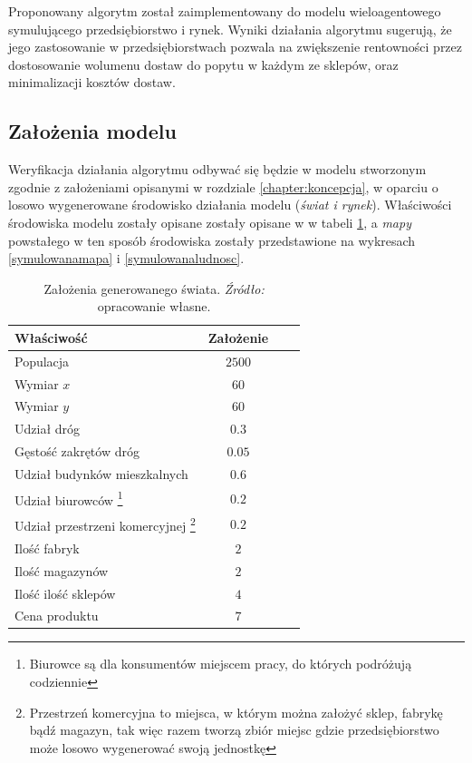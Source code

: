 \documentclass[polish, twoside, 12pt, a4paper]{article}
\theoremstyle{definition}
\theoremstyle{plain}
\theoremstyle{remark}
\begin{document}
Proponowany algorytm został zaimplementowany do modelu wieloagentowego symulującego przedsiębiorstwo i rynek. Wyniki działania algorytmu sugerują, że jego zastosowanie w przedsiębiorstwach pozwala na zwiększenie rentowności przez dostosowanie wolumenu dostaw do popytu w każdym ze sklepów, oraz minimalizacji kosztów dostaw.

\subsection{Założenia modelu}

Weryfikacja działania algorytmu odbywać się będzie w modelu stworzonym zgodnie z założeniami opisanymi w rozdziale \ref{chapter:koncepcja}, w oparciu o losowo wygenerowane środowisko działania modelu (\textit{świat i rynek}). Właściwości środowiska modelu zostały opisane zostały opisane w w tabeli \ref{tab:zalozenia}, a \textit{mapy} powstałego w ten sposób środowiska zostały przedstawione na wykresach \ref{symulowanamapa} i \ref{symulowanaludnosc}.

\begin{table}[hbt] 
  \centering
  \captionsetup{margin=10pt,font=small,labelfont=bf,width=.8\textwidth}
  \caption[Właściwości generowanego świata]{Założenia generowanego świata. \textit{Źródło:} opracowanie własne.}
  \label{tab:zalozenia}
\vspace*{2ex}
  \begin{tabular}{lccc}
    Właściwość        & Założenie \\ \hline
    Populacja & $2 500$\\
    Wymiar $x$ & $60$\\
    Wymiar $y$ & $60$\\ 
    Udział dróg & $0.3$\\ 
    Gęstość zakrętów dróg & $0.05$\\  
    Udział budynków mieszkalnych & $0.6$\\  
    Udział biurowców \footnote{Biurowce są dla konsumentów miejscem pracy, do których podróżują codziennie} & $0.2$\\  
    Udział przestrzeni komercyjnej \footnote{Przestrzeń komercyjna to miejsca, w którym można założyć sklep, fabrykę bądź magazyn, tak więc razem tworzą zbiór miejsc gdzie przedsiębiorstwo może losowo wygenerować swoją jednostkę}& $0.2$\\  \hline
    Ilość fabryk & $2$\\ 
    Ilość magazynów & $2$\\ 
    Ilość ilość sklepów & $4$\\ 
    Cena produktu & $7$\\ 
  \end{tabular}
\end{table}
\end{document}
